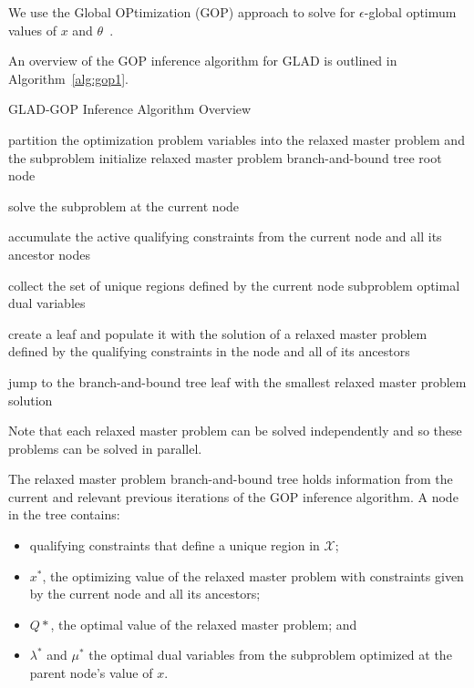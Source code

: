 \documentclass[11pt]{article}
\begin{document}
We use the Global OPtimization (GOP) approach to solve for $\epsilon$-global optimum values of $x$ and $\theta$~\cite{Floudas1990,Floudas1994}. 



An overview of the GOP inference algorithm for GLAD is outlined in Algorithm~\ref{alg:gop1}.

\begin{algorithm}[h]
\caption{GLAD-GOP Inference Algorithm Overview}
\label{alg:gop1}

\begin{algorithmic}[1]
\STATE partition the optimization problem variables into the relaxed master problem and the subproblem
\STATE initialize relaxed master problem branch-and-bound tree root node

\REPEAT
\STATE solve the subproblem at the current node

\STATE accumulate the active qualifying constraints from the current node and all its ancestor nodes

\STATE collect the set of unique regions defined by the current node subproblem optimal dual variables


\STATE create a leaf and populate it with the solution of a relaxed master problem defined by the qualifying constraints in the node and all of its ancestors

\ENDFOR

\STATE jump to the branch-and-bound tree leaf with the smallest relaxed master problem solution

\end{algorithmic}
\end{algorithm}
Note that each relaxed master problem can be solved independently and so these problems can be solved in parallel.

The relaxed master problem branch-and-bound tree holds information from the current and relevant previous iterations of the GOP inference algorithm.
A node in the tree contains: 
\begin{itemize}[noitemsep]
\item qualifying constraints that define a unique region in $\mathcal{X}$;
\item $x^*$, the optimizing value of the relaxed master problem with constraints given by the current node and all its ancestors;
\item $Q*$, the optimal value of the relaxed master problem; and
\item $\lambda^*$ and $\mu^*$ the optimal dual variables from the subproblem optimized at the parent node's value of $x$.
\end{itemize}
\end{document}
